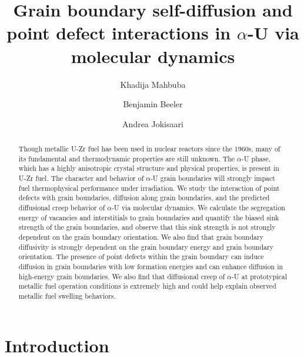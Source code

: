 \documentclass[review]{elsarticle}
\begin{document}
\begin{frontmatter}
\title{Grain boundary self-diffusion and point defect interactions in $\alpha$-U via molecular dynamics}

\author[ncsu]{Khadija Mahbuba}
\author[ncsu,inl]{Benjamin Beeler}
\author[inl]{Andrea Jokisaari}
\address[ncsu]{North Carolina State University, Raleigh, NC 27607}
\address[inl]{Idaho National Laboratory, Idaho Falls, ID 83415}
\begin{abstract}
Though metallic U-Zr fuel has been used in nuclear reactors since the 1960s, many of its fundamental and thermodynamic properties are still unknown. The $\alpha$-U phase, which has a highly anisotropic crystal structure and physical properties, is present in U-Zr fuel. The character and behavior of $\alpha$-U grain boundaries will strongly impact fuel thermophysical performance under irradiation. We study the interaction of point defects with grain boundaries, diffusion along grain boundaries, and the predicted diffusional creep behavior of $\alpha$-U via molecular dynamics. We calculate the segregation energy of vacancies and interstitials to grain boundaries and quantify the biased sink strength of the grain boundaries, and observe that this sink strength is not strongly dependent on the grain boundary orientation. We also find that grain boundary diffusivity is strongly dependent on the grain boundary energy and grain boundary orientation. The presence of point defects within the grain boundary can induce diffusion in grain boundaries with low formation energies and can enhance diffusion in high-energy grain boundaries. We also find that diffusional creep of $\alpha$-U at prototypical metallic fuel operation conditions is extremely high and could help explain observed metallic fuel swelling behaviors.
\end{abstract}

\end{frontmatter}

\linenumbers
\section{Introduction}
\end{document}
